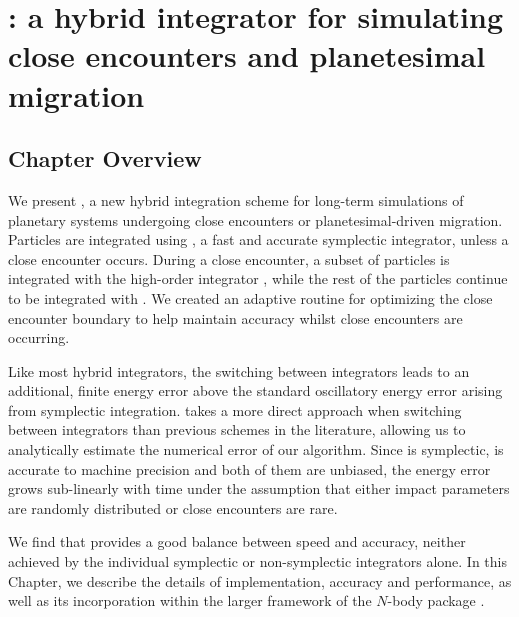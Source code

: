 \chapter[\hermes: A hybrid integrator]{\hermes: a hybrid integrator for simulating close encounters and planetesimal migration}
\label{chap:Hermes}

\section{Chapter Overview}

We present \hermes, a new hybrid integration scheme for long-term simulations of planetary systems undergoing close encounters or planetesimal-driven migration. 
Particles are integrated using \whfast, a fast and accurate symplectic integrator, unless a close encounter occurs.
During a close encounter, a subset of particles is integrated with the high-order integrator \ias, while the rest of the particles continue to be integrated with \whfast.
We created an adaptive routine for optimizing the close encounter boundary to help maintain accuracy whilst close encounters are occurring.

Like most hybrid integrators, the switching between integrators leads to an additional, finite energy error above the standard oscillatory energy error arising from symplectic integration.
\hermes takes a more direct approach when switching between integrators than previous schemes in the literature, allowing us to analytically estimate the numerical error of our algorithm. 
Since \whfast is symplectic, \ias is accurate to machine precision and both of them are unbiased, the energy error grows sub-linearly with time under the assumption that either impact parameters are randomly distributed or close encounters are rare.

We find that \hermes provides a good balance between speed and accuracy, neither achieved by the individual symplectic or non-symplectic integrators alone.
In this Chapter, we describe the details of implementation, accuracy and performance, as well as its incorporation within the larger framework of the $N$-body package \reb. 

